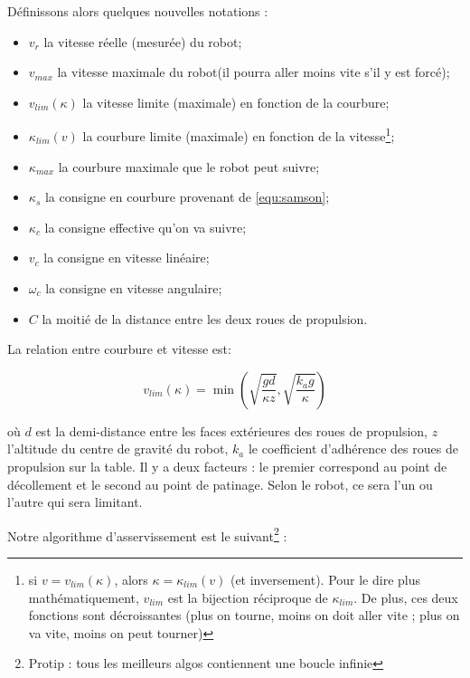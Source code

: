 \documentclass[11pt]{article}
\begin{document}
    Définissons alors quelques nouvelles notations :
    \begin{itemize}
        \item $v_r$ la vitesse réelle (mesurée) du robot;
        \item $v_{max}$ la vitesse maximale du robot(il pourra aller moins vite s'il y est forcé);
        \item $v_{lim}(\kappa)$ la vitesse limite (maximale) en fonction de la courbure;
        \item $\kappa_{lim}(v)$ la courbure limite (maximale) en fonction de la vitesse\footnote{si $v = v_{lim}(\kappa)$, alors $\kappa = \kappa_{lim}(v)$ (et inversement). Pour le dire plus mathématiquement, $v_{lim}$ est la bijection réciproque de $\kappa_{lim}$. De plus, ces deux fonctions sont décroissantes (plus on tourne, moins on doit aller vite ; plus on va vite, moins on peut tourner)};
        \item $\kappa_{max}$ la courbure maximale que le robot peut suivre;
        \item $\kappa_s$ la consigne en courbure provenant de \eqref{equ:samson};
        \item $\kappa_c$ la consigne effective qu'on va suivre;
        \item $v_c$ la consigne en vitesse linéaire;
        \item $\omega_c$ la consigne en vitesse angulaire;
        \item $C$ la moitié de la distance entre les deux roues de propulsion.
    \end{itemize}

    La relation entre courbure et vitesse est:

    $$v_{lim}(\kappa) = \min\left(\sqrt{\frac{gd}{\kappa z}}, \sqrt{\frac{k_ag}{\kappa}}\right)$$

    où $d$ est la demi-distance entre les faces extérieures des roues de propulsion, $z$ l'altitude du centre de gravité du robot, $k_a$ le coefficient d'adhérence des roues de propulsion sur la table. Il y a deux facteurs : le premier correspond au point de décollement et le second au point de patinage. Selon le robot, ce sera l'un ou l'autre qui sera limitant.

    Notre algorithme d'asservissement est le suivant\footnote{Protip : tous les meilleurs algos contiennent une boucle infinie} :
\end{document}
